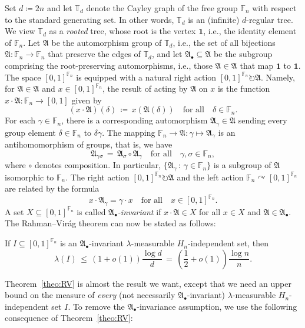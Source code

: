 \documentclass[AHL,Unicode,longabstracts,published]{cedram}
\newcommand{\0}{\varnothing}
\newcommand{\set}[1]{\{#1\}}
\renewcommand{\leq}{\leqslant}
\newcommand{\defeq}{\coloneqq}
\newcommand{\racts}{\circlearrowright}
\newcommand{\F}{\mathbb{F}}
\newcommand{\bbT}{\mathbb{T}}
\newcommand{\bfun}{\mathbf{1}}
\newcommand{\frkA}{\mathfrak{A}}
\begin{document}
Set $d \defeq 2n$ and let $\bbT_d$ denote the Cayley graph of the free group $\F_n$ with respect to the standard generating set. In other words, $\bbT_d$ is an (infinite) $d$-regular tree. We view $\bbT_d$ as a \emph{rooted} tree, whose root is the vertex $\bfun$, i.e., the identity element of $\F_n$. Let $\frkA$ be the automorphism group of $\bbT_d$, i.e., the set of all bijections $\frkA \colon \F_n \to \F_n$ that preserve the edges of $\bbT_d$, and let $\frkA_\bullet \subseteq \frkA$ be the subgroup comprising the root-preserving automorphisms, i.e., those $\frkA \in \frkA$ that map $\bfun$ to $\bfun$. The space $[0,1]^{\F_n}$ is equipped with a natural right action $[0,1]^{\F_n} \racts \frkA$. Namely, for $\frkA \in \frkA$ and $x \in [0,1]^{\F_n}$, the result of acting by $\frkA$ on $x$ is the function $x \cdot \frkA \colon \F_n \to [0,1]$ given by
\[
(x \cdot \frkA)(\delta) \,
\defeq\, x(\frkA(\delta)) \quad \text{for all}\quad \delta \in \F_n.
\]
For each $\gamma \in \F_n$, there is a corresponding automorphism $\frkA_\gamma \in \frkA$ sending every group element $\delta \in \F_n$ to $\delta \gamma$. The mapping $\F_n \to \frkA \colon \gamma \mapsto \frkA_\gamma$ is an antihomomorphism of groups, that is, we have
\[
\frkA_{\gamma \sigma} \,=\, \frkA_\sigma \circ \frkA_\gamma \quad \text{for all}\quad\gamma
, \sigma \in \F_n,
\]
where $\circ$ denotes composition. In particular, $\set{\frkA_\gamma \,:\, \gamma \in \F_n}$ is a subgroup of $\frkA$ isomorphic to $\F_n$. The right action $[0,1]^{\F_n} \racts \frkA$ and the left action $\F_n \curvearrowright [0,1]^{\F_n}$ are related by the formula
\[
x \cdot \frkA_\gamma = \gamma \cdot x \quad \text{for all}\quad x \in [0,1]^{\F_n}.
\]
A set $X \subseteq [0,1]^{\F_n}$ is called \emph{$\frkA_\bullet$-invariant} if $x \cdot \frkA \in X$ for all $x \in X$ and $\frkA \in \frkA_\bullet$. The Rahman--Virág theorem can now be stated as follows:

\begin{theo}\label{theo:RV}
If $I \subseteq [0,1]^{\F_n}$ is an $\frkA_\bullet$-invariant $\lambda$-measurable $H_n$-independent set, then
\[
\lambda(I) \,\leq\, (1+o(1)) \frac{\log d}{d} \,=\, \left(\frac{1}{2} + o(1)\right) \frac{\log n}{n}.
\]
\end{theo}

Theorem~\ref{theo:RV} is almost the result we want, except that we need an upper bound on the measure of \emph{every} (not necessarily $\frkA_\bullet$-invariant) $\lambda$-measurable $H_n$-independent set $I$. To remove the $\frkA_\bullet$-invariance assumption, we use the following consequence of Theorem~\ref{theo:RV}:
\end{document}
